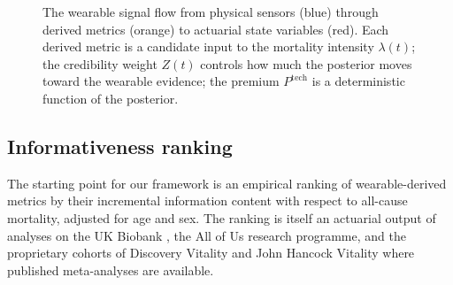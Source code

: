\documentclass[11pt,a4paper]{article}
\theoremstyle{ia}
\newcommand{\1}{\mathbf{1}}
\begin{document}
\begin{figure}[ht]
{%
}
\caption{The wearable signal flow from physical sensors (blue) through
derived metrics (orange) to actuarial state variables (red). Each
derived metric is a candidate input to the mortality intensity
$\lambda(t)$; the credibility weight $Z(t)$ controls how much the
posterior moves toward the wearable evidence; the premium
$P^{\mathrm{tech}}$ is a deterministic function of the posterior.}
\label{fig:signal-flow}
\end{figure}

\subsection{Informativeness ranking}\label{ss:rank}

The starting point for our framework is an empirical ranking of
wearable-derived metrics by their incremental information content
with respect to all-cause mortality, adjusted for age and sex. The
ranking is itself an actuarial output of analyses on the UK Biobank
\citep{Biobank2024}, the All of Us research programme, and the
proprietary cohorts of Discovery Vitality and John Hancock Vitality
where published meta-analyses are available.
\end{document}
